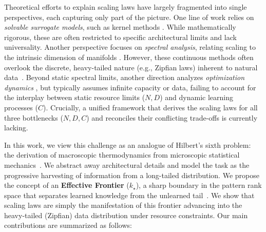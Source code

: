 \documentclass{article}
\theoremstyle{plain}
\theoremstyle{definition}
\theoremstyle{remark}
\begin{document}
Theoretical efforts to explain scaling laws have largely fragmented into single perspectives, each capturing only part of the picture. One line of work relies on \textit{solvable surrogate models}, such as kernel methods \citep{jacot2020neuraltangentkernelconvergence, bordelon2021spectrumdependentlearningcurves, maloney2022solvablemodelneuralscaling, Bahri_2024}. While mathematically rigorous, these are often restricted to specific architectural limits and lack universality. Another perspective focuses on \textit{spectral analysis}, relating scaling to the intrinsic dimension of manifolds \citep{sharma2020neuralscalinglawdimension, Spigler_2020}. However, these continuous methods often overlook the discrete, heavy-tailed nature (e.g., Zipfian laws) inherent to natural data~\citep{pan2025understandingllmbehaviorscompression}. Beyond static spectral limits, another direction analyzes \textit{optimization dynamics} \citep{bordelon2022learningcurvessgdstructured, arous2025learningquadraticneuralnetworks, ren2025emergencescalinglawssgd, luo2025multipowerlawlosscurve, li2025functionalscalinglawskernel}, but typically assumes infinite capacity or data, failing to account for the interplay between static resource limits ($N, D$) and dynamic learning processes ($C$). Crucially, a unified framework that derives the scaling laws for all three bottlenecks ($N, D, C$) and reconciles their conflicting trade-offs is currently lacking.


In this work, we view this challenge as an analogue of Hilbert's sixth problem: the derivation of macroscopic thermodynamics from microscopic statistical mechanics~\citep{deng2025hilbertssixthproblemderivation}. We abstract away architectural details and model the task as the progressive harvesting of information from a long-tailed distribution. We propose the concept of an \textbf{Effective Frontier} ($k_\star$), a sharp boundary in the pattern rank space that separates learned knowledge from the unlearned tail~\citep{pan2025understandingllmbehaviorscompression}. We show that scaling laws are simply the manifestation of this frontier advancing into the heavy-tailed (Zipfian) data distribution under resource constraints. Our main contributions are summarized as follows:
\end{document}
